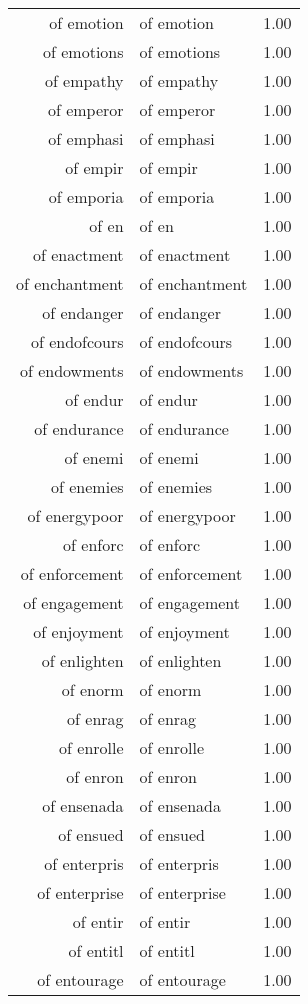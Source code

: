 \begin{table}[ht]
\begin{tabular}{rlr}
  of emotion & of emotion & 1.00 \\ 
  of emotions & of emotions & 1.00 \\ 
  of empathy & of empathy & 1.00 \\ 
  of emperor & of emperor & 1.00 \\ 
  of emphasi & of emphasi & 1.00 \\ 
  of empir & of empir & 1.00 \\ 
  of emporia & of emporia & 1.00 \\ 
  of en & of en & 1.00 \\ 
  of enactment & of enactment & 1.00 \\ 
  of enchantment & of enchantment & 1.00 \\ 
  of endanger & of endanger & 1.00 \\ 
  of endofcours & of endofcours & 1.00 \\ 
  of endowments & of endowments & 1.00 \\ 
  of endur & of endur & 1.00 \\ 
  of endurance & of endurance & 1.00 \\ 
  of enemi & of enemi & 1.00 \\ 
  of enemies & of enemies & 1.00 \\ 
  of energypoor & of energypoor & 1.00 \\ 
  of enforc & of enforc & 1.00 \\ 
  of enforcement & of enforcement & 1.00 \\ 
  of engagement & of engagement & 1.00 \\ 
  of enjoyment & of enjoyment & 1.00 \\ 
  of enlighten & of enlighten & 1.00 \\ 
  of enorm & of enorm & 1.00 \\ 
  of enrag & of enrag & 1.00 \\ 
  of enrolle & of enrolle & 1.00 \\ 
  of enron & of enron & 1.00 \\ 
  of ensenada & of ensenada & 1.00 \\ 
  of ensued & of ensued & 1.00 \\ 
  of enterpris & of enterpris & 1.00 \\ 
  of enterprise & of enterprise & 1.00 \\ 
  of entir & of entir & 1.00 \\ 
  of entitl & of entitl & 1.00 \\ 
  of entourage & of entourage & 1.00 \\ 

\end{tabular}
\end{table}
